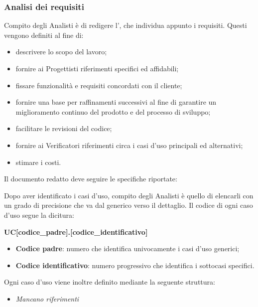             \subsubsection{Analisi dei requisiti}
            Compito degli Analisti è di redigere l'\AdR, che individua appunto i requisiti. Questi vengono definiti al fine di:
            \begin{itemize}
        		\item{descrivere lo scopo del lavoro;}
		\item{fornire ai Progettisti riferimenti specifici ed affidabili;}
		\item{fissare funzionalità e requisiti concordati con il cliente;}
		\item{fornire una base per raffinamenti successivi al fine di garantire un miglioramento continuo del prodotto e del processo di sviluppo;}
		\item{facilitare le revisioni del codice;}
		\item{fornire ai Verificatori riferimenti circa i casi d'uso principali ed alternativi;}
		\item{stimare i costi.}
        	   \end{itemize}
                 
                 Il documento redatto deve seguire le specifiche riportate:
                 
                Dopo aver identificato i casi d'uso, compito degli Analisti è quello di elencarli con un grado di precisione che va dal generico verso il dettaglio.
                Il codice di ogni caso d'uso segue la dicitura: 
                \begin{center}
                \textbf{UC[codice\_padre].[codice\_identificativo]}
                \end{center}
                
                \begin{itemize}
                 	\item{\textbf{Codice padre}: numero che identifica univocamente i casi d'uso generici;}
			\item{\textbf{Codice identificativo}: numero progressivo che identifica i sottocasi specifici.}
                \end{itemize}
                
                Ogni caso d'uso viene inoltre definito mediante la seguente struttura:
                \begin{itemize}
                \item{\textit{Mancano riferimenti}}
                \end{itemize}
                
